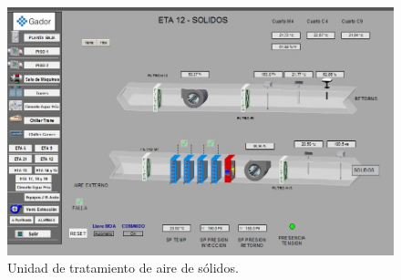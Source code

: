 \begin{figure}[h]
	\centering
	\includegraphics[width=\textwidth]{./Figures/ch2EBI2.jpg}
	\caption{Unidad de tratamiento de aire de sólidos.}
	\label{fig:ch2EBI2}
\end{figure}
